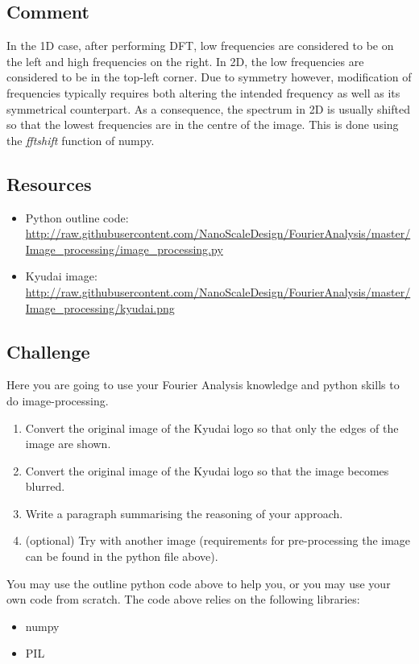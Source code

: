 \subsection*{Comment}
In the 1D case, after performing DFT, low frequencies are considered to be on the left and high frequencies on the right.
In 2D, the low frequencies are considered to be in the top-left corner.
Due to symmetry however, modification of frequencies typically requires both altering the intended frequency as well as its symmetrical counterpart.
As a consequence, the spectrum in 2D is usually shifted so that the lowest frequencies are in the centre of the image. This is done using the \emph{fftshift} function of numpy.

\subsection*{Resources}
\begin{itemize}
    \item Python outline code: \url{http://raw.githubusercontent.com/NanoScaleDesign/FourierAnalysis/master/Image_processing/image_processing.py}
    \item Kyudai image: \url{http://raw.githubusercontent.com/NanoScaleDesign/FourierAnalysis/master/Image_processing/kyudai.png}
\end{itemize}

\subsection*{Challenge}
Here you are going to use your Fourier Analysis knowledge and python skills to do image-processing.

\begin{enumerate}
    \item Convert the original image of the Kyudai logo so that only the edges of the image are shown.
    \item Convert the original image of the Kyudai logo so that the image becomes blurred.
    \item \label{it:reasoning} Write a paragraph summarising the reasoning of your approach.
    \item \label{it:extraimage} (optional) Try with another image (requirements for pre-processing the image can be found in the python file above).
\end{enumerate}

You may use the outline python code above to help you, or you may use your own code from scratch. The code above relies on the following libraries:
\begin{itemize}
    \item numpy
    \item PIL
\end{itemize}

